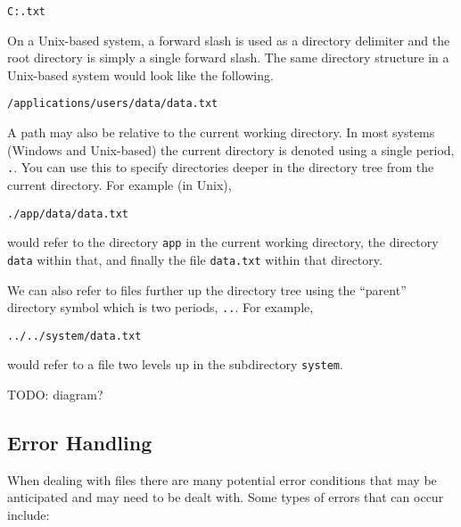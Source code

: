 \texttt{C:\applications\users\data\data.txt}

On a Unix-based system, a forward slash is used as
a directory delimiter and the root directory is simply a
single forward slash.  The same directory structure in
a Unix-based system would look like the following.

\texttt{/applications/users/data/data.txt}

A path may also be relative to the current working 
directory.  In most systems (Windows and Unix-based)
the current directory is denoted using a single period,
\texttt{.}.  You can use this to specify 
directories deeper in the directory tree from the current
directory.  For example (in Unix), 

\texttt{./app/data/data.txt}

would refer to the directory \texttt{app} in
the current working directory, the directory \texttt{data}
within that, and finally the file \texttt{data.txt}
within that directory.

We can also refer to files further up the directory 
tree using the ``parent'' directory symbol which is 
two periods, \texttt{..}.  For example, 

\texttt{../../system/data.txt}

would refer to a file two levels up in the subdirectory
\texttt{system}.

TODO: diagram?

\subsection{Error Handling}

When dealing with files there are many potential error
conditions that may be anticipated and may need to be
dealt with.  Some types of errors that can occur include:

